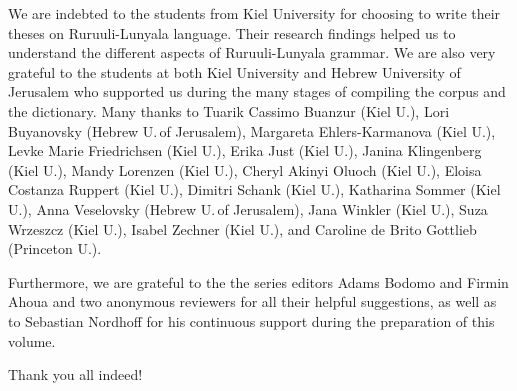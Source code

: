 We are indebted to the students from Kiel University for choosing to write their theses on Ru\-ruu\-li\hyp{}Lu\-nya\-la language. Their research findings helped us to understand the different aspects of Ru\-ruu\-li\hyp{}Lu\-nya\-la grammar. 
We are also very grateful to the students at both Kiel University and Hebrew University of Jerusalem who supported us during the many stages of compiling the corpus and the dictionary. Many thanks to Tuarik Cassimo Buanzur (Kiel U.),
Lori Buyanovsky (Hebrew U.\,of Jerusalem), Margareta Ehlers-Kar\-ma\-nova (Kiel U.), Levke Marie Friedrichsen (Kiel U.), Erika Just (Kiel U.), Janina Klingenberg (Kiel U.), Mandy Lorenzen (Kiel U.), Cheryl Akinyi Oluoch (Kiel U.), Eloisa Co\-stanza Ruppert (Kiel U.), Dimitri Schank (Kiel U.), Katharina Sommer (Kiel U.), Anna Veselovsky  (Hebrew U.\,of Jerusalem), Jana Winkler (Kiel U.), Suza Wrze\-szcz (Kiel U.), Isabel Zechner (Kiel U.), and Caroline de Brito Gottlieb (Princeton U.).

Furthermore, we are grateful to the the series editors Adams Bodomo and Firmin Ahoua and two anonymous reviewers for all their helpful suggestions, as well as to Sebastian Nordhoff for his continuous support during the preparation of this volume.

Thank you all indeed!
